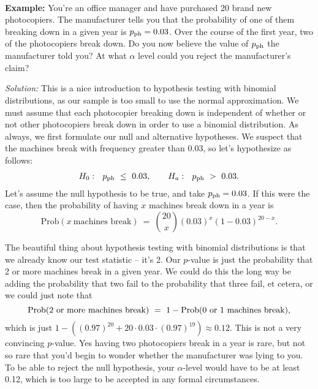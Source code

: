 \ \\

\textbf{Example:} \ex You're an office manager and have purchased 20 brand new photocopiers.  The manufacturer tells you that the probability of one of them breaking down in a given year is $p_{\rm ph}=0.03$.  Over the course of the first year, two of the photocopiers break down.  Do you now believe the value of $p_{\rm ph}$ the manufacturer told you?  At what $\alpha$ level could you reject the manufacturer's claim?

\emph{Solution:} This is a nice introduction to hypothesis testing with binomial distributions, as our sample is too small to use the normal approximation. We must assume that each photocopier breaking down is independent of whether or not other photocopiers break down in order to use a binomial distribution. As always, we first formulate our null and alternative hypotheses. We suspect that the machines break with frequency greater than 0.03, so let's hypothesize as follows:
\begin{eqnarray}
H_0:\ \ p_{\rm ph}\  \leq\ 0.03,\ \ \ \ \ \ H_a:\  \ p_{\rm ph}\ >\ 0.03.
\end{eqnarray}
Let's assume the null hypothesis to be true, and take $p_{\rm ph} = 0.03$.  If this were the case, then the probability of having $x$ machines break down in a year is
\begin{equation*}
\textrm{Prob}(x \ \textrm{machines \ break}) \ = \  {{20}\choose{x}}(0.03)^x(1-0.03)^{20-x}.
\end{equation*}

The beautiful thing about hypothesis testing with binomial distributions is that we already know our test statistic -- it's 2.  Our $p$-value is just the probability that 2 or more machines break in a given year.  We could do this the long way be adding the probability that two fail to the probability that three fail, et cetera, or we could just note that
\begin{equation*}
\rm{Prob}(2 \ or \ more \ machines \ break) \ = \  1 - \rm{Prob}(0 \ or \ 1 \ machines \ break),
\end{equation*}
which is just $1-\left((0.97)^{20} + 20\cdot 0.03 \cdot (0.97)^{19}\right) \approx 0.12$.  This is not a very convincing $p$-value.  Yes having two photocopiers break in a year is rare, but not so rare that you'd begin to wonder whether the manufacturer was lying to you.  To be able to reject the null hypothesis, your $\alpha$-level would have to be at least 0.12, which is too large to be accepted in any formal circumstances.

